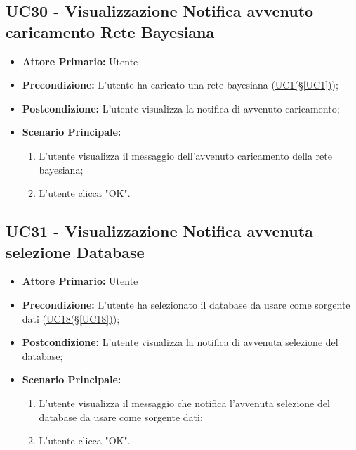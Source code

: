 \pagebreak

\subsection{UC30 - Visualizzazione Notifica avvenuto caricamento Rete Bayesiana}\label{UC30}

\begin{itemize}
	\item \textbf{Attore Primario:} Utente
	\item \textbf{Precondizione:} L'utente ha caricato una rete bayesiana (\hyperref[UC1]{UC1(§\ref*{UC1})});
	\item \textbf{Postcondizione:} L'utente visualizza la notifica di avvenuto caricamento;
	\item \textbf{Scenario Principale:}
	\begin{enumerate}
		\item L'utente visualizza il messaggio dell'avvenuto caricamento della rete bayesiana;
		\item L'utente clicca "OK".
	\end{enumerate}
\end{itemize}

\pagebreak

\subsection{UC31 - Visualizzazione Notifica avvenuta selezione Database}\label{UC31}

\begin{itemize}
	\item \textbf{Attore Primario:} Utente
	\item \textbf{Precondizione:} L'utente ha selezionato il database da usare come sorgente dati (\hyperref[UC18]{UC18(§\ref*{UC18})});
	\item \textbf{Postcondizione:} L'utente visualizza la notifica di avvenuta selezione del database;
	\item \textbf{Scenario Principale:}
	\begin{enumerate}
		\item L'utente visualizza il messaggio che notifica l'avvenuta selezione del database da usare come sorgente dati;
		\item L'utente clicca "OK".
	\end{enumerate}
\end{itemize}

\pagebreak

